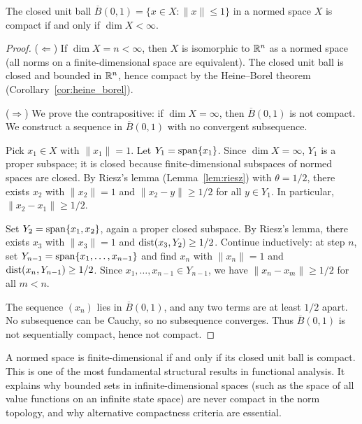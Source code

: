 \documentclass[11pt,a4paper]{article}
\begin{document}
\begin{theorem}
\label{thm:riesz_compact}
The closed unit ball $\overline{B}(0,1) = \{x \in X : \|x\| \le 1\}$ in a
normed space $X$ is compact if and only if $\dim X < \infty$.
\end{theorem}

\begin{proof}
($\Leftarrow$) If $\dim X = n < \infty$, then $X$ is isomorphic to $\mathbb{R}^n$
as a normed space (all norms on a finite-dimensional space are equivalent).
The closed unit ball is closed and bounded in $\mathbb{R}^n$, hence compact by the
Heine--Borel theorem (Corollary~\ref{cor:heine_borel}).

($\Rightarrow$) We prove the contrapositive: if $\dim X = \infty$, then
$\overline{B}(0,1)$ is not compact. We construct a sequence in
$\overline{B}(0,1)$ with no convergent subsequence.

Pick $x_1 \in X$ with $\|x_1\| = 1$. Let $Y_1 = \operatorname{span}\{x_1\}$. Since
$\dim X = \infty$, $Y_1$ is a proper subspace; it is closed because
finite-dimensional subspaces of normed spaces are closed. By Riesz's lemma
(Lemma~\ref{lem:riesz}) with $\theta = 1/2$, there exists $x_2$ with
$\|x_2\| = 1$ and $\|x_2 - y\| \ge 1/2$ for all $y \in Y_1$. In particular,
$\|x_2 - x_1\| \ge 1/2$.

Set $Y_2 = \operatorname{span}\{x_1, x_2\}$, again a proper closed subspace. By Riesz's
lemma, there exists $x_3$ with $\|x_3\| = 1$ and $\operatorname{dist}(x_3, Y_2) \ge 1/2$.
Continue inductively: at step $n$, set
$Y_{n-1} = \operatorname{span}\{x_1, \ldots, x_{n-1}\}$ and find $x_n$ with
$\|x_n\| = 1$ and $\operatorname{dist}(x_n, Y_{n-1}) \ge 1/2$. Since $x_1, \ldots,
x_{n-1} \in Y_{n-1}$, we have $\|x_n - x_m\| \ge 1/2$ for all $m < n$.

The sequence $(x_n)$ lies in $\overline{B}(0,1)$, and any two terms are at
least $1/2$ apart. No subsequence can be Cauchy, so no subsequence converges.
Thus $\overline{B}(0,1)$ is not sequentially compact, hence not compact.
\end{proof}

\begin{keyresult}[title={Riesz's Theorem: Finite Dimension via Compactness}]
A normed space is finite-dimensional if and only if its closed unit ball is
compact. This is one of the most fundamental structural results in functional
analysis. It explains why bounded sets in infinite-dimensional spaces (such
as the space of all value functions on an infinite state space) are never
compact in the norm topology, and why alternative compactness criteria are
essential.
\end{keyresult}
\end{document}
